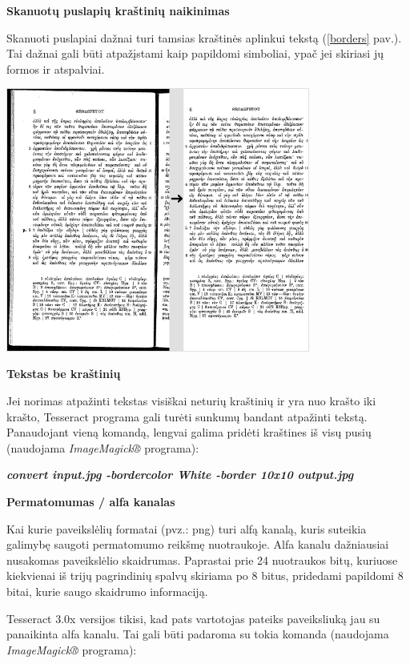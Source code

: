 \documentclass{VUMIFInfBakalaurinis}
\begin{document}
\textbf{Skanuotų puslapių kraštinių naikinimas}

Skanuoti puslapiai dažnai turi tamsias kraštinės aplinkui tekstą (\ref{borders} pav.). 
Tai dažnai gali būti atpažįstami kaip papildomi simboliai, ypač jei skiriasi jų formos ir atspalviai.

\begin{minipage}{\linewidth}
  \centering
  \includegraphics[width=10cm]{borders.png}
  \label{borders}
\end{minipage}

\textbf{Tekstas be kraštinių}

Jei norimas atpažinti tekstas visiškai neturių kraštinių ir yra nuo krašto iki krašto, Tesseract programa gali turėti sunkumų bandant atpažinti tekstą.
Panaudojant vieną komandą, lengvai galima pridėti kraštines iš visų pusių (naudojama \textit{ImageMagick®} programa):

\textbf{\textit{convert  input.jpg  -bordercolor White -border 10x10 output.jpg}}

\textbf{Permatomumas / alfa kanalas}

Kai kurie paveikslėlių formatai (pvz.: png) turi alfą kanalą, kuris suteikia galimybę saugoti permatomumo reikšmę nuotraukoje.
Alfa kanalu dažniausiai nusakomas paveikslėlio skaidrumas. Paprastai prie 24 nuotraukos bitų, kuriuose kiekvienai iš trijų pagrindinių spalvų skiriama po 8 bitus, pridedami papildomi
8 bitai, kurie saugo skaidrumo informaciją. 

Tesseract 3.0x versijos tikisi, kad pats vartotojas pateiks paveiksliuką jau su panaikinta alfa kanalu. Tai gali būti padaroma su tokia komanda (naudojama \textit{ImageMagick®} programa):
\end{document}
